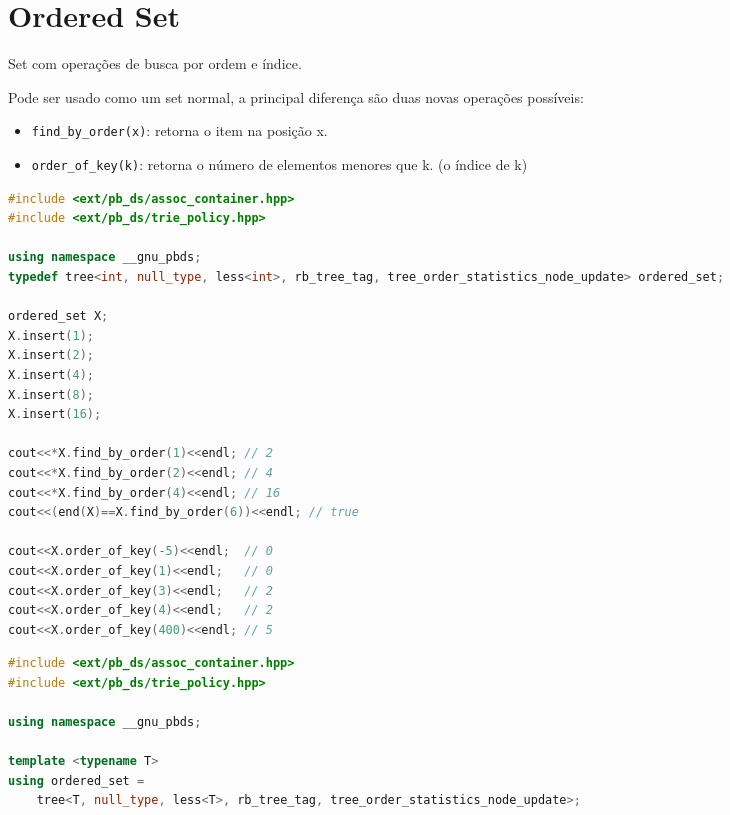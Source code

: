 \documentclass[11pt, a4paper, oneside]{book}
\begin{document}
\hfill

\section{Ordered Set}


Set com operações de busca por ordem e índice.



Pode ser usado como um set normal, a principal diferença são duas novas operações possíveis:



\begin{itemize}
\item \lstinline{find_by_order(x)}: retorna o item na posição x.
\item \lstinline{order_of_key(k)}: retorna o número de elementos menores que k. (o índice de k)
\end{itemize}



\textbf{} 
\begin{lstlisting}[language=C++]
#include <ext/pb_ds/assoc_container.hpp>
#include <ext/pb_ds/trie_policy.hpp>

using namespace __gnu_pbds;
typedef tree<int, null_type, less<int>, rb_tree_tag, tree_order_statistics_node_update> ordered_set;

ordered_set X;
X.insert(1);
X.insert(2);
X.insert(4);
X.insert(8);
X.insert(16);

cout<<*X.find_by_order(1)<<endl; // 2
cout<<*X.find_by_order(2)<<endl; // 4
cout<<*X.find_by_order(4)<<endl; // 16
cout<<(end(X)==X.find_by_order(6))<<endl; // true

cout<<X.order_of_key(-5)<<endl;  // 0
cout<<X.order_of_key(1)<<endl;   // 0
cout<<X.order_of_key(3)<<endl;   // 2
cout<<X.order_of_key(4)<<endl;   // 2
cout<<X.order_of_key(400)<<endl; // 5

\end{lstlisting}

\hfill

\begin{multicols}{2}
\begin{lstlisting}[language=C++]
#include <ext/pb_ds/assoc_container.hpp>
#include <ext/pb_ds/trie_policy.hpp>

using namespace __gnu_pbds;

template <typename T>
using ordered_set =
    tree<T, null_type, less<T>, rb_tree_tag, tree_order_statistics_node_update>;\end{lstlisting}
\end{multicols}
\end{document}

